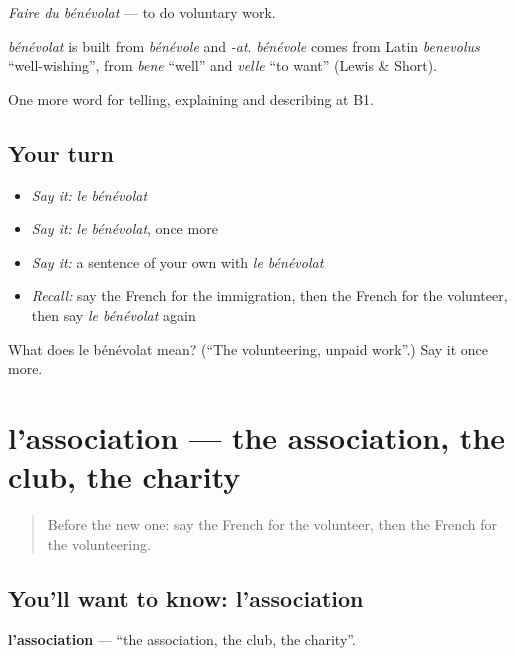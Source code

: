 \emph{Faire du bénévolat} — to do voluntary work.

\begin{cousinweb}
\emph{bénévolat} is built from \emph{bénévole} and \emph{-at}. \emph{bénévole} comes from Latin \emph{benevolus} \textquotedblleft{}well-wishing\textquotedblright{}, from \emph{bene} \textquotedblleft{}well\textquotedblright{} and \emph{velle} \textquotedblleft{}to want\textquotedblright{} (Lewis \& Short).
\end{cousinweb}

\begin{grammarlens}[title={What you've built}]
One more word for telling, explaining and describing at B1.
\end{grammarlens}

\subsection*{Your turn}
\begin{itemize}
\raggedright
  \item \emph{Say it:} \emph{le bénévolat}
  \item \emph{Say it:} \emph{le bénévolat}, once more
  \item \emph{Say it:} a sentence of your own with \emph{le bénévolat}
  \item \emph{Recall:} say the French for the immigration, then the French for the volunteer, then say \emph{le bénévolat} again
\end{itemize}

\begin{tcolorbox}[breakable,colback=teal!4,colframe=teal!35!black,title={Before you move on}]
What does le bénévolat mean? (\textquotedblleft{}The volunteering, unpaid work\textquotedblright{}.) Say it once more.
\end{tcolorbox}
\section[l'association]{l'association — the association, the club, the charity}

\label{lesson:FR-C366-association}



\begin{quote}
Before the new one: say the French for the volunteer, then the French for the volunteering.
\end{quote}

\subsection*{You'll want to know: l'association}
\textbf{l'association} — \textquotedblleft{}the association, the club, the charity\textquotedblright{}.

